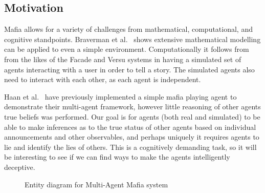 \documentclass[12pt]{article} %
\begin{document}

\subsection{Motivation} 

Mafia allows for a variety of challenges from mathematical, computational, and cognitive standpoints. Braverman et al.~\cite{BRA2008} shows extensive mathematical modelling can be applied to even a simple environment. Computationally it follows from from the likes of the Facade and Versu systems in having a simulated set of agents interacting with a user in order to tell a story. The simulated agents also need to interact with each other, as each agent is independent. 

Haan et al.~\cite{HAA2004} have previously implemented a simple mafia playing agent to demonstrate their multi-agent framework, however little reasoning of other agents true beliefs was performed. Our goal is for agents (both real and simulated) to be able to make inferences as to the true status of other agents based on individual announcements and other observables, and perhaps uniquely it requires agents to lie and identify the lies of others. This is a cognitively demanding task, so it will be interesting to see if we can find ways to make the agents intelligently deceptive. 


\begin{figure}[H] 
\caption{Entity diagram for Multi-Agent Mafia system}
\end{figure}
\end{document}
